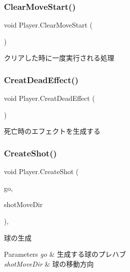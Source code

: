 \subsubsection{\texorpdfstring{Clear\+Move\+Start()}{ClearMoveStart()}}
{\footnotesize\ttfamily void Player.\+Clear\+Move\+Start (\begin{DoxyParamCaption}{ }\end{DoxyParamCaption})\hspace{0.3cm}{\ttfamily [inline]}}



クリアした時に一度実行される処理 

\mbox{\label{class_player_ae737f5c0952f352da117d07cce727e6d}} 
\subsubsection{\texorpdfstring{Creat\+Dead\+Effect()}{CreatDeadEffect()}}
{\footnotesize\ttfamily void Player.\+Creat\+Dead\+Effect (\begin{DoxyParamCaption}{ }\end{DoxyParamCaption})\hspace{0.3cm}{\ttfamily [inline]}}



死亡時のエフェクトを生成する 

\mbox{\label{class_player_a2ae58096ded4d63ab46232618cb6f1a4}} 
\subsubsection{\texorpdfstring{Create\+Shot()}{CreateShot()}}
{\footnotesize\ttfamily void Player.\+Create\+Shot (\begin{DoxyParamCaption}\item[{\hyperlink{class_player_shot}{Player\+Shot}}]{go,  }\item[{Vector3}]{shot\+Move\+Dir }\end{DoxyParamCaption})\hspace{0.3cm}{\ttfamily [inline]}, {\ttfamily [private]}}



球の生成 


\begin{DoxyParams}{Parameters}
{\em go} & 生成する球のプレハブ\\
\hline
{\em shot\+Move\+Dir} & 球の移動方向\\
\hline
\end{DoxyParams}
\mbox{\label{class_player_a61abc629af38a106fcb7cd94ac0dff45}} 
